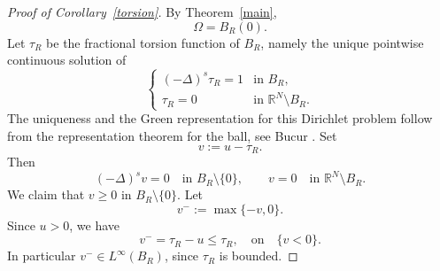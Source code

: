 \documentclass[11pt,a4paper]{article}
\newcommand{\R}{\mathbb R}
\begin{document}
\begin{proof}[Proof of Corollary~\ref{torsion}]
By Theorem~\ref{main},
\[
\Omega=B_R(0).
\]
Let \(\tau_{R}\) be the fractional torsion function of \(B_R\), namely the
unique pointwise continuous solution of
\[
\begin{cases}
(-\Delta)^s\tau_{R}=1 & \text{in }B_R,\\
\tau_{R}=0 & \text{in }\R^N\setminus B_R.
\end{cases}
\]
The uniqueness and the Green representation for this Dirichlet problem follow
from the representation theorem for the ball, see Bucur \cite[Theorem~3.2]{Bucur}.
Set
\[
v:=u-\tau_{R}.
\]
Then
\[
(-\Delta)^s v=0
\quad\text{in }B_R\setminus\{0\},
\qquad
v=0
\quad\text{in }\R^N\setminus B_R.
\]
We claim that \(v\ge0\) in \(B_R\setminus\{0\}\). Let
\[
v^-:=\max\{-v,0\}.
\]
Since \(u>0\), we have
\[
v^-=\tau_{R}-u\le \tau_{R}, \quad \text{on} \quad \{v<0\}.
\]
In particular \(v^-\in L^\infty(B_R)\), since \(\tau_{R}\) is bounded.


\end{proof}
\end{document}

